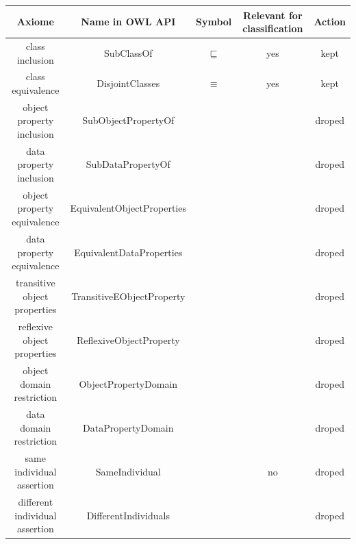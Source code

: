 \documentclass[a4paper]{article}
\begin{document}
\begin{center}
	\begin{tabular}{|c | c | c | c| c|} 
		\hline
		Axiome                                           & Name in OWL API                  & Symbol        & Relevant for classification  & Action        \\
		\hline\hline
		class inclusion                                  & SubClassOf                       & $\sqsubseteq$ & yes                          & kept          \\ 
		\hline
		class equivalence                                & DisjointClasses                  & $\equiv$      & yes                          & kept          \\
		\hline
		object property inclusion                        & SubObjectPropertyOf              &               &                              & droped        \\
		\hline
		data property inclusion                          & SubDataPropertyOf                &               &                              & droped        \\
		\hline
		object property equivalence                      & EquivalentObjectProperties       &               &                              & droped        \\
		\hline
		data property equivalence                        & EquivalentDataProperties         &               &                              & droped        \\
		\hline
		transitive object properties                     & TransitiveEObjectProperty        &               &                              & droped        \\
		\hline
		reflexive object properties                      & ReflexiveObjectProperty          &               &                              & droped        \\
		\hline
		object domain restriction                        & ObjectPropertyDomain             &               &                              & droped        \\
		\hline
		data domain restriction                          & DataPropertyDomain               &               &                              & droped        \\
		\hline
		same individual assertion                        & SameIndividual                   &               & no                           & droped        \\
		\hline
		different individual assertion                   & DifferentIndividuals             &               &                              & droped        \\

\end{tabular}
\end{center}
\end{document}
